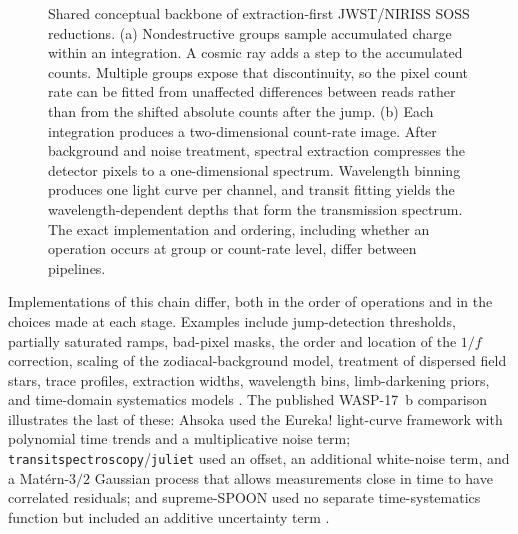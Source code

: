 \begin{figure}[t]
  \centering
  
  \caption{Shared conceptual backbone of extraction-first JWST/NIRISS SOSS
  reductions. (a) Nondestructive groups sample accumulated charge within an
  integration. A cosmic ray adds a step to the accumulated counts. Multiple
  groups expose that discontinuity, so the pixel count rate can be fitted from
  unaffected differences between reads rather than from the shifted absolute
  counts after the jump.
  (b) Each integration produces a two-dimensional count-rate image. After
  background and noise treatment, spectral extraction compresses the detector
  pixels to a one-dimensional spectrum. Wavelength binning produces one light
  curve per channel, and transit fitting yields the wavelength-dependent depths
  that form the transmission spectrum. The exact implementation and ordering,
  including whether an operation occurs at group or count-rate level, differ
  between pipelines.}
  \label{fig:extraction-first-workflow}
\end{figure}


Implementations of this chain differ, both in the order of operations and in
the choices made at each stage. Examples include jump-detection thresholds,
partially saturated ramps, bad-pixel masks, the order and location of the
$1/f$ correction, scaling of the zodiacal-background model, treatment of
dispersed field stars, trace profiles, extraction widths, wavelength bins,
limb-darkening priors, and time-domain systematics models
\citep{RadicaEtAl2023,HolmbergMadhusudhan2023,LouieEtAl2025}. The published
WASP-17~b comparison illustrates the last of these: Ahsoka used the Eureka!
light-curve framework \citep{BellEtAl2022} with polynomial time trends and a
multiplicative noise term; \texttt{transitspectroscopy}/\texttt{juliet} used
an offset, an additional white-noise term, and a Mat\'ern-$3/2$ Gaussian
process that allows measurements close in time to have correlated residuals;
and supreme-SPOON used no separate time-systematics function but included an
additive uncertainty term \citep{LouieEtAl2025}.

